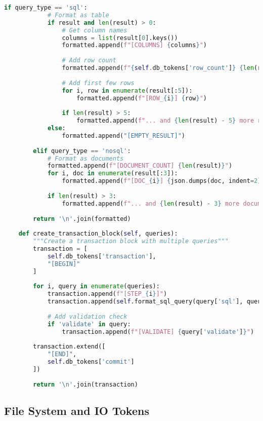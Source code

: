 \begin{lstlisting}[language=Python, caption=Database query tokens]
        if query_type == 'sql':
            # Format as table
            if result and len(result) > 0:
                # Get column names
                columns = list(result[0].keys())
                formatted.append(f"[COLUMNS] {columns}")
                
                # Add row count
                formatted.append(f"{self.db_tokens['row_count']} {len(result)}")
                
                # Add first few rows
                for i, row in enumerate(result[:5]):
                    formatted.append(f"[ROW_{i}] {row}")
                
                if len(result) > 5:
                    formatted.append(f"... and {len(result) - 5} more rows")
            else:
                formatted.append("[EMPTY_RESULT]")
                
        elif query_type == 'nosql':
            # Format as documents
            formatted.append(f"[DOCUMENT_COUNT] {len(result)}")
            for i, doc in enumerate(result[:3]):
                formatted.append(f"[DOC_{i}] {json.dumps(doc, indent=2)}")
            
            if len(result) > 3:
                formatted.append(f"... and {len(result) - 3} more documents")
        
        return '\n'.join(formatted)
    
    def create_transaction_block(self, queries):
        """Create a transaction block with multiple queries"""
        transaction = [
            self.db_tokens['transaction'],
            "[BEGIN]"
        ]
        
        for i, query in enumerate(queries):
            transaction.append(f"[STEP_{i}]")
            transaction.append(self.format_sql_query(query['sql'], query.get('params')))
            
            # Add validation check
            if 'validate' in query:
                transaction.append(f"[VALIDATE] {query['validate']}")
        
        transaction.extend([
            "[END]",
            self.db_tokens['commit']
        ])
        
        return '\n'.join(transaction)
\end{lstlisting}

\subsection{File System and IO Tokens}

